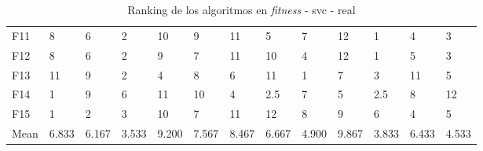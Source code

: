 \begin{table}
\begin{adjustbox}{width=\linewidth}
\begin{tabular}{lllllllllllll}
            F11  & 8     & 6     & 2     & 10    & 9     & 11    & 5     & 7     & 12    & 1     & 4     & 3     \\
            F12  & 8     & 6     & 2     & 9     & 7     & 11    & 10    & 4     & 12    & 1     & 5     & 3     \\
            F13  & 11    & 9     & 2     & 4     & 8     & 6     & 11    & 1     & 7     & 3     & 11    & 5     \\
            F14  & 1     & 9     & 6     & 11    & 10    & 4     & 2.5   & 7     & 5     & 2.5   & 8     & 12    \\
            F15  & 1     & 2     & 3     & 10    & 7     & 11    & 12    & 8     & 9     & 6     & 4     & 5     \\
            Mean & 6.833 & 6.167 & 3.533 & 9.200 & 7.567 & 8.467 & 6.667 & 4.900 & 9.867 & 3.833 & 6.433 & 4.533 \\
            \bottomrule
        \end{tabular}
    \end{adjustbox}
    \caption{Ranking de los algoritmos en \textit{fitness} - svc - real}
    \label{tab:ranking_fitness_real_svc}
\end{table}


